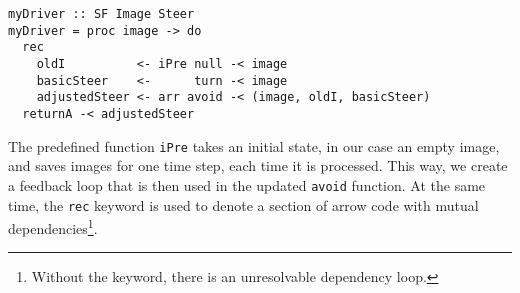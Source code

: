\begin{lstlisting}[float,caption=Using ArrowLoop to send feedback,label=lst:loop]
myDriver :: SF Image Steer
myDriver = proc image -> do
  rec
    oldI          <- iPre null -< image
    basicSteer    <-      turn -< image
    adjustedSteer <- arr avoid -< (image, oldI, basicSteer)
  returnA -< adjustedSteer
\end{lstlisting}

The predefined function \texttt{iPre} takes an initial state, in our case an empty image, and saves images for one time step, each time it is processed.
This way, we create a feedback loop that is then used in the updated \texttt{avoid} function.
At the same time, the \texttt{rec} keyword is used to denote a section of arrow code with  mutual dependencies\footnote{Without the keyword, there is an unresolvable dependency loop.}.



 
